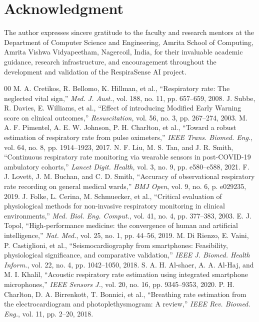 \documentclass[journal]{IEEEtran}
\begin{document}
\section*{Acknowledgment}
The author expresses sincere gratitude to the faculty and research mentors at the Department of Computer Science and Engineering, Amrita School of Computing, Amrita Vishwa Vidyapeetham, Nagercoil, India, for their invaluable academic guidance, research infrastructure, and encouragement throughout the development and validation of the RespiraSense AI project.

\begin{thebibliography}{00}
 M. A. Cretikos, R. Bellomo, K. Hillman, et al., ``Respiratory rate: The neglected vital sign,'' \textit{Med. J. Aust.}, vol. 188, no. 11, pp. 657--659, 2008.
 J. Subbe, R. Davies, E. Williams, et al., ``Effect of introducing Modified Early Warning score on clinical outcomes,'' \textit{Resuscitation}, vol. 56, no. 3, pp. 267--274, 2003.
 M. A. F. Pimentel, A. E. W. Johnson, P. H. Charlton, et al., ``Toward a robust estimation of respiratory rate from pulse oximeters,'' \textit{IEEE Trans. Biomed. Eng.}, vol. 64, no. 8, pp. 1914--1923, 2017.
 N. F. Liu, M. S. Tan, and J. R. Smith, ``Continuous respiratory rate monitoring via wearable sensors in post-COVID-19 ambulatory cohorts,'' \textit{Lancet Digit. Health}, vol. 3, no. 9, pp. e580--e588, 2021.
 F. J. Lovett, J. M. Buchan, and C. D. Smith, ``Accuracy of observational respiratory rate recording on general medical wards,'' \textit{BMJ Open}, vol. 9, no. 6, p. e029235, 2019.
 J. Folke, L. Cerina, M. Schmuecker, et al., ``Critical evaluation of physiological methods for non-invasive respiratory monitoring in clinical environments,'' \textit{Med. Biol. Eng. Comput.}, vol. 41, no. 4, pp. 377--383, 2003.
 E. J. Topol, ``High-performance medicine: the convergence of human and artificial intelligence,'' \textit{Nat. Med.}, vol. 25, no. 1, pp. 44--56, 2019.
 M. Di Rienzo, E. Vaini, P. Castiglioni, et al., ``Seismocardiography from smartphones: Feasibility, physiological significance, and comparative validation,'' \textit{IEEE J. Biomed. Health Inform.}, vol. 22, no. 4, pp. 1042--1050, 2018.
 S. A. H. Al-shaer, A. A. Al-Haj, and M. I. Khalil, ``Acoustic respiratory rate estimation using integrated smartphone microphones,'' \textit{IEEE Sensors J.}, vol. 20, no. 16, pp. 9345--9353, 2020.
 P. H. Charlton, D. A. Birrenkott, T. Bonnici, et al., ``Breathing rate estimation from the electrocardiogram and photoplethysmogram: A review,'' \textit{IEEE Rev. Biomed. Eng.}, vol. 11, pp. 2--20, 2018.

\end{thebibliography}
\end{document}
